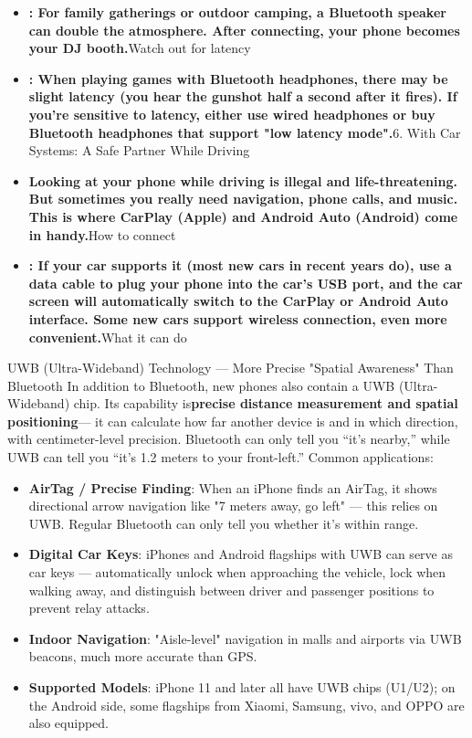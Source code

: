 \begin{itemize}
  \item \textbf{: For family gatherings or outdoor camping, a Bluetooth speaker can double the atmosphere. After connecting, your phone becomes your DJ booth.}Watch out for latency
  \item \textbf{: When playing games with Bluetooth headphones, there may be slight latency (you hear the gunshot half a second after it fires). If you're sensitive to latency, either use wired headphones or buy Bluetooth headphones that support "low latency mode".}6. With Car Systems: A Safe Partner While Driving
  \item \textbf{Looking at your phone while driving is illegal and life-threatening. But sometimes you really need navigation, phone calls, and music. This is where CarPlay (Apple) and Android Auto (Android) come in handy.}How to connect
  \item \textbf{: If your car supports it (most new cars in recent years do), use a data cable to plug your phone into the car's USB port, and the car screen will automatically switch to the CarPlay or Android Auto interface. Some new cars support wireless connection, even more convenient.}What it can do
\end{itemize}

\begin{tcbinfo}{UWB (Ultra-Wideband) Technology — More Precise "Spatial Awareness" Than Bluetooth}
In addition to Bluetooth, new phones also contain a UWB (Ultra-Wideband) chip. Its capability is\textbf{precise distance measurement and spatial positioning}— it can calculate how far another device is and in which direction, with centimeter-level precision. Bluetooth can only tell you “it's nearby,” while UWB can tell you “it's 1.2 meters to your front-left.” Common applications:

\begin{itemize}
  \item \textbf{AirTag / Precise Finding}: When an iPhone finds an AirTag, it shows directional arrow navigation like "7 meters away, go left" — this relies on UWB. Regular Bluetooth can only tell you whether it's within range.
  \item \textbf{Digital Car Keys}: iPhones and Android flagships with UWB can serve as car keys — automatically unlock when approaching the vehicle, lock when walking away, and distinguish between driver and passenger positions to prevent relay attacks.
  \item \textbf{Indoor Navigation}: "Aisle-level" navigation in malls and airports via UWB beacons, much more accurate than GPS.
  \item \textbf{Supported Models}: iPhone 11 and later all have UWB chips (U1/U2); on the Android side, some flagships from Xiaomi, Samsung, vivo, and OPPO are also equipped.
\end{itemize}

\end{tcbinfo}

